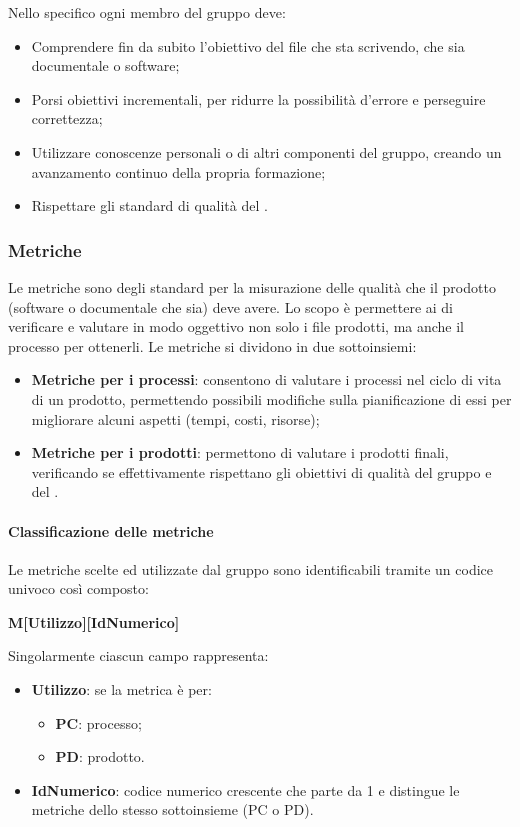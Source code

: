 Nello specifico ogni membro del gruppo deve:
\begin{itemize}
	\item Comprendere fin da subito l'obiettivo del file che sta scrivendo, che sia documentale o software;
	\item Porsi obiettivi incrementali, per ridurre la possibilità d'errore e perseguire correttezza;
	\item Utilizzare conoscenze personali o di altri componenti del gruppo, creando un avanzamento continuo della propria formazione;
	\item Rispettare gli standard di qualità del \PdQv{}.
\end{itemize}

\subsubsection{Metriche}
Le metriche sono degli standard per la misurazione delle qualità che il prodotto (software o documentale che sia) deve avere. Lo scopo è permettere ai  di verificare e valutare in modo oggettivo non solo i file prodotti, ma anche il processo per ottenerli. 
Le metriche si dividono in due sottoinsiemi: 
\begin{itemize}
	\item \textbf{Metriche per i processi}: consentono di valutare i processi nel ciclo di vita di un prodotto, permettendo possibili modifiche sulla pianificazione di essi per migliorare alcuni aspetti (tempi, costi, risorse); 
	\item \textbf{Metriche per i prodotti}: permettono di valutare i prodotti finali, verificando se effettivamente rispettano gli obiettivi di qualità del gruppo e del .
\end{itemize}

\paragraph{Classificazione delle metriche}
Le metriche scelte ed utilizzate dal gruppo sono identificabili tramite un codice univoco così composto: 
\begin{center}
\textbf{M[Utilizzo][IdNumerico]}
\end{center}
Singolarmente ciascun campo rappresenta:
\begin{itemize}
	\item \textbf{Utilizzo}: se la metrica è per:
			\begin{itemize}
				\item \textbf{PC}: processo;
				\item \textbf{PD}: prodotto.
			\end{itemize}
	\item \textbf{IdNumerico}: codice numerico crescente che parte da 1 e distingue le metriche dello stesso sottoinsieme (PC o PD). 
\end{itemize}

